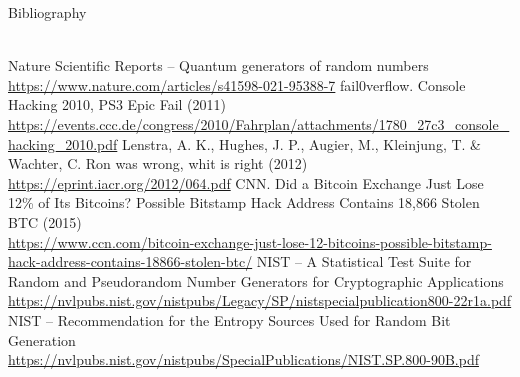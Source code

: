 \documentclass[12pt,a4paper,oneside]{article}
\begin{document}
Bibliography
\\\\
\begin{thebibliography}{12}
	\sloppy
	 Nature Scientific Reports -- Quantum generators of random numbers \\ \url{https://www.nature.com/articles/s41598-021-95388-7}
	 fail0verflow. Console Hacking 2010, PS3 Epic Fail (2011) \\ \url{https://events.ccc.de/congress/2010/Fahrplan/attachments/1780_27c3_console_hacking_2010.pdf}
	 Lenstra, A. K., Hughes, J. P., Augier, M., Kleinjung, T. \& Wachter, C. Ron was wrong, whit is right (2012) \\ \url{https://eprint.iacr.org/2012/064.pdf}
	 CNN. Did a Bitcoin Exchange Just Lose 12\% of Its Bitcoins? Possible Bitstamp Hack Address Contains 18,866 Stolen BTC (2015) \\ \url{https://www.ccn.com/bitcoin-exchange-just-lose-12-bitcoins-possible-bitstamp-hack-address-contains-18866-stolen-btc/}
	 NIST -- A Statistical Test Suite for Random and Pseudorandom Number Generators for Cryptographic Applications \\ \url{https://nvlpubs.nist.gov/nistpubs/Legacy/SP/nistspecialpublication800-22r1a.pdf}
	 NIST -- Recommendation for the Entropy Sources Used for Random Bit Generation \\ \url{https://nvlpubs.nist.gov/nistpubs/SpecialPublications/NIST.SP.800-90B.pdf}
\end{thebibliography}
\end{document}
